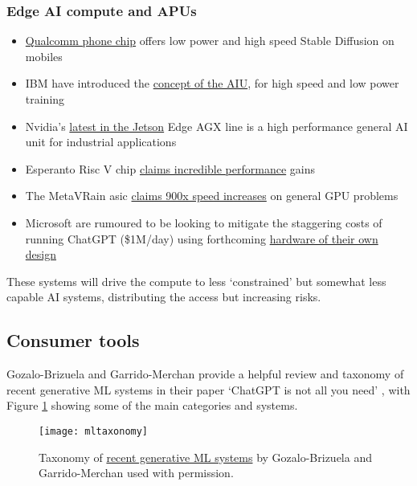 \subsubsection{Edge AI compute and APUs}
\begin{itemize}
\item \href{https://www.theverge.com/2023/2/23/23611668/ai-image-stable-diffusion-mobile-android-qualcomm-fastest}{Qualcomm phone chip} offers low power and high speed Stable Diffusion on mobiles
\item IBM have introduced the \href{https://research.ibm.com/blog/ibm-artificial-intelligence-unit-aiu}{concept of the AIU}, for high speed and low power training
\item Nvidia's \href{https://www.okdo.com/p/nvidia-jetson-agx-orin-64gb-developer-kit/}{latest in the Jetson} Edge AGX line is a high performance general AI unit for industrial applications
\item Esperanto Risc V chip \href{https://www.esperanto.ai/News/risc-v-startup-esperanto-technologies-samples-first-ai-silicon/}{claims incredible performance} gains
\item The MetaVRain asic \href{https://hdh4797.wixsite.com/dhan/project-1}{claims 900x speed increases} on general GPU problems
\item Microsoft are rumoured to be looking to mitigate the staggering costs of running ChatGPT (\$1M/day) using forthcoming \href{https://www.theinformation.com/articles/microsoft-readies-ai-chip-as-machine-learning-costs-surge?}{hardware of their own design}
\end{itemize}
 These systems will drive the compute to less `constrained' but somewhat less capable AI systems, distributing the access but increasing risks.
\subsection{Consumer tools}
Gozalo-Brizuela and Garrido-Merchan provide a helpful review and taxonomy of recent generative ML systems in their paper `ChatGPT is not all you need' \cite{gozalo2023chatgpt}, with Figure \ref{fig:MLtaxonomy} showing some of the main categories and systems. 

\begin{figure}
  \centering
    \texttt{[image: mltaxonomy]}
  \caption{Taxonomy of \href{https://arxiv.org/abs/2301.04655}{recent generative ML systems} by Gozalo-Brizuela and Garrido-Merchan used with permission.}
  \label{fig:MLtaxonomy}
\end{figure}

